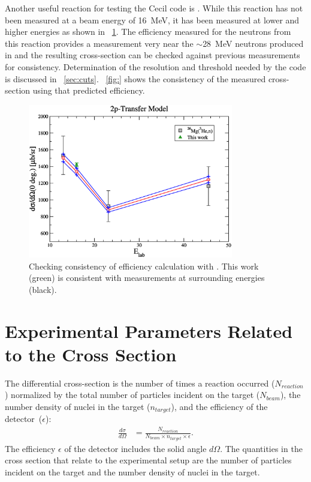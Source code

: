 Another useful reaction for testing the Cecil code is \MgReaction.  While this reaction has not been measured at a beam energy of 16~MeV, it has been measured at lower and higher energies as shown in {\fig}~\ref{fig:efficiencyCalib}.  The efficiency measured for the neutrons from this reaction provides a measurement very near the $\sim$28~MeV neutrons produced in \reaction and the resulting cross-section can be checked against previous measurements for consistency.  Determination of the resolution and threshold needed by the code is discussed in {\sect}~\ref{sec:cuts}.  {\fig}~\ref{fig:} shows the consistency of the measured cross-section using that predicted efficiency.
\begin{figure}[!htbp]
\centering
\includegraphics[width=0.8\textwidth]{figures/magnesiumMatch.eps}
\caption{Checking consistency of efficiency calculation with \MgReaction.  This work (green) is consistent with measurements at surrounding energies (black).}
\label{fig:efficiencyCalib}
\end{figure}

\section{Experimental Parameters Related to the Cross Section}

The differential cross-section is the number of times a reaction occurred ($N_{reaction}$) normalized by the total number of particles incident on the target ($N_{beam}$), the number density of nuclei in the target ($n_{target}$), and the {efficiency of the detector}~($\epsilon$):
\begin{align}
\frac{d\sigma}{d\Omega} &= \frac{N_{reaction}}{N_{beam} \times n_{target} \times \epsilon}.
\label{eq:cross_section}
\end{align}
The efficiency $\epsilon$ of the detector includes the solid angle $d\Omega$.  The quantities in the cross section that relate to the experimental setup are the number of particles incident on the target and the number density of nuclei in the target.

